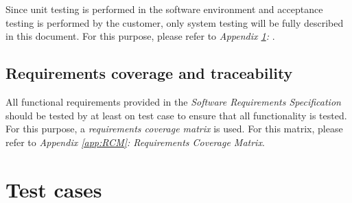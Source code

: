\documentclass[12pt,titlepage]{article}
\begin{document}
Since unit testing is performed in the software environment and acceptance
testing is performed by the customer, only system testing will be fully
described in this document. For this purpose, please refer to
\textit{Appendix \ref{app:test-cases}: }.

\subsection{Requirements coverage and traceability}
\label{subsec:requirements-coverage-and-testability}

All functional requirements provided in the \textit{Software Requirements
Specification} should be tested by at least on test case to ensure that all
functionality is tested. For this purpose, a \textit{requirements coverage
matrix} is used. For this matrix, please refer to \textit{Appendix
\ref{app:RCM}: Requirements Coverage Matrix}.



\newpage
\appendix

\section{Test cases}
\label{app:test-cases}

\begin{usecase}
\end{usecase}

\begin{usecase}
\end{usecase}
\end{document}
